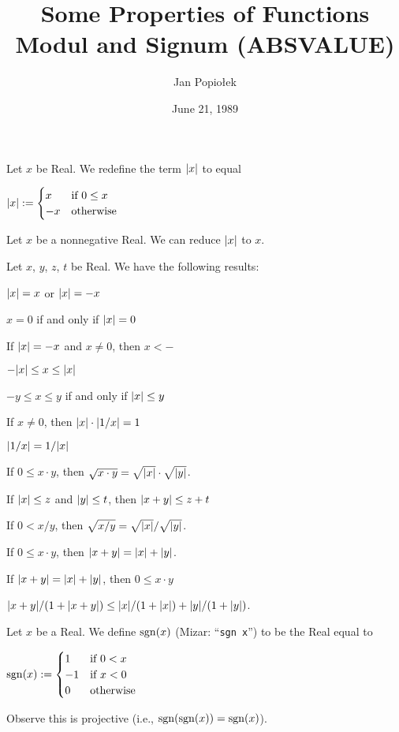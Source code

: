 \documentclass{article}
\title{Some Properties of Functions Modul and Signum (ABSVALUE)}
\author{Jan Popio{\l}ek}
\date{June 21, 1989}
\begin{document}
\maketitle

\begin{definition}
Let $x$ be Real. We redefine the term $\lvert x\rvert$ to equal
\begin{defn}
\item $\displaystyle{\lvert x\rvert:=\begin{cases}x & \mbox{if }0\leq x\\
-x & \mbox{otherwise}
  \end{cases}}$
\end{defn}
\end{definition}

Let $x$ be a nonnegative Real. We can reduce $\lvert x\rvert$ to $x$.

Let $x$, $y$, $z$, $t$ be Real. We have the following results:
\begin{thm}
\item\label{absvalue:1} $\lvert x\rvert=x$ or $\lvert x\rvert=-x$
\item\label{absvalue:2} $x=0$ if and only if $\lvert x\rvert=0$
\item\label{absvalue:3} If $\lvert x\rvert=-x$ and $x\neq0$, then $x<-$
\item\label{absvalue:4} $-\lvert x\rvert\leq x\leq\lvert x\rvert$
\item\label{absvalue:5} $-y\leq x\leq y$ if and only if $\lvert x\rvert\leq y$
\item\label{absvalue:6} If $x\neq0$, then $\lvert x\rvert\cdot\lvert1/x\rvert=1$
\item\label{absvalue:7} $\lvert1/x\rvert=1/\lvert x\rvert$
\item\label{absvalue:8} If $0\leq x\cdot y$, then $\sqrt{x\cdot y}=\sqrt{\lvert x\rvert}\cdot\sqrt{\lvert y\rvert}$.
\item\label{absvalue:9} If $\lvert x\rvert\leq z$ and $\lvert y\rvert\leq t$, then
  $\lvert x+y\rvert\leq z+t$
\item\label{absvalue:10} If $0<x/y$, then $\sqrt{x/y}=\sqrt{\lvert x\rvert}/\sqrt{\lvert y\rvert}$.
\item\label{absvalue:11} If $0\leq x\cdot y$, then $\lvert x+y\rvert=\lvert x\rvert+\lvert y\rvert$.
\item\label{absvalue:12} If $\lvert x+y\rvert=\lvert x\rvert+\lvert y\rvert$, then $0\leq x\cdot y$
\item\label{absvalue:13} $\lvert x+y\rvert/(1+\lvert x+y\rvert)\leq\lvert x\rvert/(1+\lvert x\rvert)+\lvert y\rvert/(1+\lvert y\rvert)$.
\end{thm}

\begin{definition}
Let $x$ be a Real.
We define $\operatorname{sgn}(x)$ (Mizar: ``\verb#sgn x#'') to be the Real equal to
\begin{defn}
\item $\displaystyle{\operatorname{sgn}(x):=\begin{cases}
  1 & \mbox{if } 0<x\\
  -1 & \mbox{if } x < 0\\
  0 & \mbox{otherwise}
  \end{cases}}$
\end{defn}
Observe this is projective (i.e., $\operatorname{sgn}(\operatorname{sgn}(x))=\operatorname{sgn}(x)$).
\end{definition}
\end{document}
